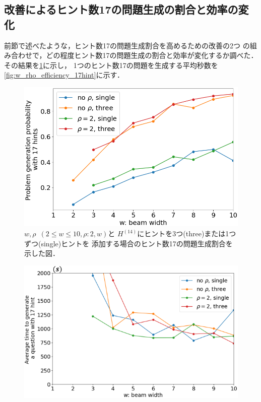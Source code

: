 \documentclass[a4paper, 9pt]{jarticle}
\begin{document}
\begin{論文概要}
\section{改善によるヒント数17の問題生成の割合と効率の変化}
前節で述べたような，ヒント数17の問題生成割合を高めるための改善の2つ
の組み合わせで，どの程度ヒント数17の問題生成の割合と効率が変化するか調べた．
その結果を\figurename{\ref{fig:w_rho_prob_17hint}}に示し，
1つのヒント数17の問題を生成する平均秒数を
\figurename{\ref{fig:w_rho_efficiency_17hint}}に示す．
\begin{figure}[bt]
  \vspace{-3mm}
  \centering
  \includegraphics[keepaspectratio, scale=0.3]{w_rho_prob_17hint.png}
  \caption{$w,\rho$~$(2 \leq w \leq 10,\rho:2,w)$と
  $H^{(14)}$にヒントを3つ(three)または1つずつ(single)ヒントを
  添加する場合のヒント数17の問題生成割合を示した図．} 
  \label{fig:w_rho_prob_17hint}
\end{figure}
\begin{figure}[bt]
  \vspace{-2mm}
  \centering
  \includegraphics[keepaspectratio, scale=0.4]{w_rho_efficiency_17hint.png}

\end{figure}
\end{論文概要}
\end{document}
